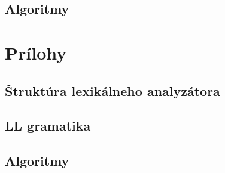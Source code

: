 \documentclass[12pt]{article}
\begin{document}
		\subsection{Algoritmy}
	\section{Prílohy}
		\subsection{Štruktúra lexikálneho analyzátora}
		\subsection{LL gramatika}

		\subsection{Algoritmy}
	
\end{document}

